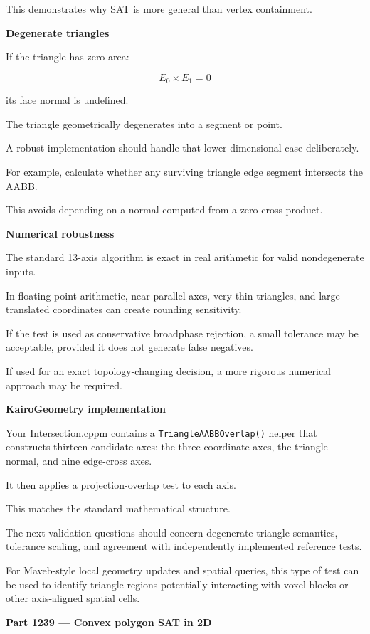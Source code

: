 This demonstrates why SAT is more general than vertex containment.

\textbf{Degenerate triangles}

If the triangle has zero area:

\[
E_0\times E_1=0
\]

its face normal is undefined.

The triangle geometrically degenerates into a segment or point.

A robust implementation should handle that lower-dimensional case deliberately.

For example, calculate whether any surviving triangle edge segment intersects the AABB.

This avoids depending on a normal computed from a zero cross product.

\textbf{Numerical robustness}

The standard 13-axis algorithm is exact in real arithmetic for valid nondegenerate inputs.

In floating-point arithmetic, near-parallel axes, very thin triangles, and large translated coordinates can create rounding sensitivity.

If the test is used as conservative broadphase rejection, a small tolerance may be acceptable, provided it does not generate false negatives.

If used for an exact topology-changing decision, a more rigorous numerical approach may be required.

\textbf{KairoGeometry implementation}

Your \href{https://github.com/swayam8624/KairoGeometry/blob/master/Intersection.cppm?utm_source=chatgpt.com}{Intersection.cppm} contains a \texttt{TriangleAABBOverlap()} helper that constructs thirteen candidate axes: the three coordinate axes, the triangle normal, and nine edge-cross axes.

It then applies a projection-overlap test to each axis.

This matches the standard mathematical structure.

The next validation questions should concern degenerate-triangle semantics, tolerance scaling, and agreement with independently implemented reference tests.

For Maveb-style local geometry updates and spatial queries, this type of test can be used to identify triangle regions potentially interacting with voxel blocks or other axis-aligned spatial cells.

\textbf{Part 1239 --- Convex polygon SAT in 2D}

